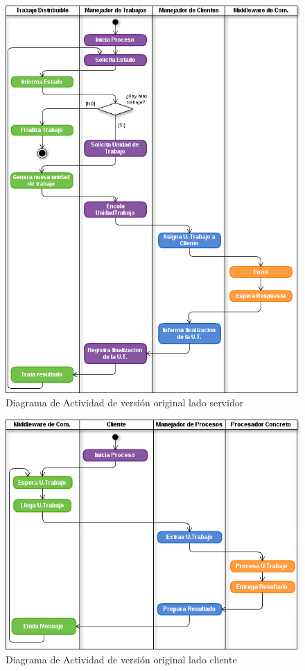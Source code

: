     \begin{figure}[ht]
        \includegraphics[scale=0.65]{images/ActivityFuDServer-Orig.png}
        \caption{Diagrama de Actividad de \fud{} versión original lado servidor}
            \label{FuDServerOrig}
    \end{figure}

    \begin{figure}[ht]
        \includegraphics[scale=0.70]{images/ActivityFuDClient-Orig.png}
        \caption{Diagrama de Actividad de \fud{} versión original lado cliente}
            \label{FuDClientOrig}
    \end{figure}



